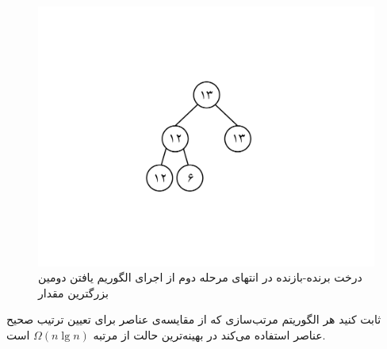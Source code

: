 \begin{figure}
\begin{center}
\includegraphics[scale=0.36]{figs/ch5/winner_loser_tree_3.pdf}
\caption{درخت برنده-بازنده در انتهای مرحله دوم از اجرای الگوریم یافتن دومین بزرگترین مقدار}\label{ch5:fig:winLose3}
\end{center}
\end{figure}

 ثابت کنید هر الگوریتم مرتب‌سازی که از مقایسه‌ی عناصر برای تعیین ترتیب صحیح عناصر استفاده می‌کند در بهینه‌ترین حالت از مرتبه {$\Omega (n\lg n)$} است.


